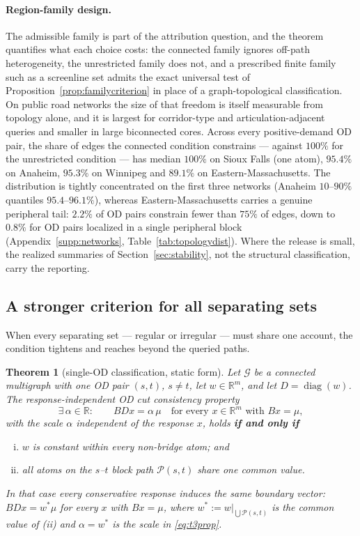 \documentclass[a4paper,fleqn]{cas-sc}
\newtheorem{theorem}{Theorem}
\newcommand{\R}{\mathbb{R}}
\begin{document}
\paragraph{Region-family design.}
The admissible family is part of the attribution question, and the theorem
quantifies what each choice costs: the connected family ignores off-path
heterogeneity, the unrestricted family does not, and a prescribed finite
family such as a screenline set admits the exact universal test of
Proposition~\ref{prop:familycriterion} in place of a graph-topological
classification.
On public road networks the size of that freedom is itself measurable
from topology alone, and it is largest for corridor-type and
articulation-adjacent queries and smaller in large biconnected cores.
Across every positive-demand OD pair, the share of edges the connected
condition constrains --- against $100\%$ for the unrestricted condition
--- has median $100\%$ on Sioux Falls (one atom), $95.4\%$ on Anaheim,
$95.3\%$ on Winnipeg and $89.1\%$ on Eastern-Massachusetts. The
distribution is tightly concentrated on the first three networks
(Anaheim $10$--$90\%$ quantiles $95.4$--$96.1\%$), whereas
Eastern-Massachusetts carries a genuine peripheral tail: $2.2\%$ of OD
pairs constrain fewer than $75\%$ of edges, down to $0.8\%$ for OD
pairs localized in a single peripheral block (Appendix~\ref{supp:networks},
Table~\ref{tab:topologydist}). Where the release is small, the
realized summaries of Section~\ref{sec:stability}, not the structural
classification, carry the reporting.

\subsection{A stronger criterion for all separating sets}\label{sec:allsets}
When every separating set --- regular or irregular --- must share one
account, the condition tightens and reaches beyond the queried paths.

\begin{theorem}[single-OD classification, static form]\label{thm:t3cpmain}
Let $\mathcal{G}$ be a connected multigraph with one OD pair $(s,t)$,
\textbf{$s\neq t$}, let
$w\in\R^m$, and let $D=\operatorname{diag}(w)$. The
\emph{response-independent OD cut consistency property}
\begin{equation}
\exists\,\alpha\in\R:\qquad BDx=\alpha\,\mu
\quad\text{for every }x\in\R^m\text{ with }Bx=\mu,
\label{eq:t3prop}
\end{equation}
with the scale $\alpha$ independent of the response $x$, holds
\textbf{if and only if}
\begin{enumerate}[(i)]
\item $w$ is constant within every non-bridge atom; and
\item all atoms on the $s$--$t$ block path $\mathcal{P}(s,t)$ share
one common value.
\end{enumerate}
In that case every conservative response induces the same boundary vector:
$BDx=w^*\mu$ for every $x$ with $Bx=\mu$, where
$w^*:=w|_{\bigcup\mathcal{P}(s,t)}$ is the common value of (ii) and
$\alpha=w^*$ is the scale in \eqref{eq:t3prop}.
\end{theorem}
\end{document}
